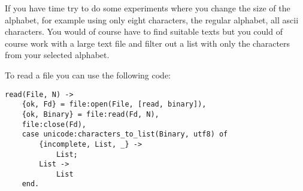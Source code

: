 \documentclass[a4paper,11pt]{article}
\begin{document}
If you have time try to do some experiments where you change the size
of the alphabet, for example using only eight characters, the regular
alphabet, all ascii characters. You would of course have to find
suitable texts but you could of course work with a large text file and
filter out a list with only the characters from your selected alphabet.


To read a file you can use the following code:

\begin{verbatim}
read(File, N) ->
    {ok, Fd} = file:open(File, [read, binary]),
    {ok, Binary} = file:read(Fd, N),
    file:close(Fd),
    case unicode:characters_to_list(Binary, utf8) of
        {incomplete, List, _} ->
            List;
        List ->
            List
    end.
\end{verbatim}
\end{document}
